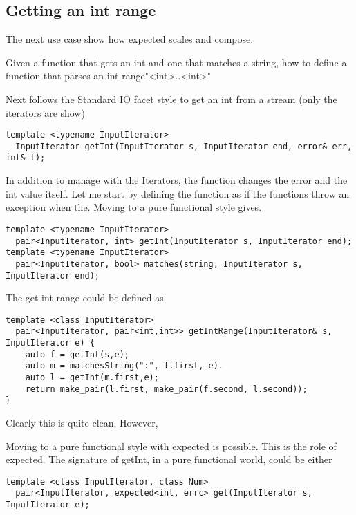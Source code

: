 \documentclass[a4paper,10pt]{article}
\begin{document}
\subsection{Getting an int range}

The next use case show how expected scales and compose. 

Given a function that gets an int and one that matches a string, how to define a function that parses an int range"<int>..<int>"

Next follows the Standard IO facet style to get an int from a stream (only the iterators are show)

\begin{lstlisting}
template <typename InputIterator>
  InputIterator getInt(InputIterator s, InputIterator end, error& err, int& t);
\end{lstlisting}

In addition to manage with the Iterators, the function changes the error and the int value itself. Let me start by defining the function as if the functions throw an exception when the. Moving to a pure functional style gives.

\begin{lstlisting}
template <typename InputIterator>
  pair<InputIterator, int> getInt(InputIterator s, InputIterator end);
template <typename InputIterator>
  pair<InputIterator, bool> matches(string, InputIterator s, InputIterator end);
\end{lstlisting}

The get int range could be defined as

\begin{lstlisting}
template <class InputIterator>
  pair<InputIterator, pair<int,int>> getIntRange(InputIterator& s, InputIterator e) {
    auto f = getInt(s,e);
    auto m = matchesString(":", f.first, e).
    auto l = getInt(m.first,e);       
    return make_pair(l.first, make_pair(f.second, l.second));
}
\end{lstlisting}

Clearly this is quite clean. However, 

Moving to a pure functional style with expected is possible.
This is the role of expected. The signature of getInt, in a pure functional world,  could be either

\begin{lstlisting}
template <class InputIterator, class Num>
  pair<InputIterator, expected<int, errc> get(InputIterator s, InputIterator e);
\end{lstlisting}
\end{document}
